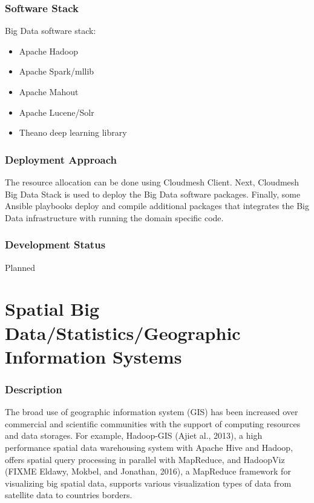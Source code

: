 \documentclass[9pt,twocolumn,twoside]{styles/osajnl}
\begin{document}
\subsubsection{Software Stack}

Big Data software stack:

\begin{itemize}
\item Apache Hadoop
\item Apache Spark/mllib
\item Apache Mahout
\item Apache Lucene/Solr
\item Theano deep learning library
\end{itemize}

\subsubsection{Deployment Approach}

The resource allocation can be done using Cloudmesh Client.  Next,
Cloudmesh Big Data Stack is used to deploy the Big Data software
packages.  Finally, some Ansible playbooks deploy and compile
additional packages that integrates the Big Data infrastructure with
running the domain specific code.

\subsubsection{Development Status}

Planned


\section{Spatial Big Data/Statistics/Geographic Information Systems}

\subsubsection{Description}

The broad use of geographic information system (GIS) has been
increased over commercial and scientific communities with the support
of computing resources and data storages. For example, Hadoop-GIS
(Ajiet al., 2013), a high performance spatial data warehousing system
with Apache Hive and Hadoop, offers spatial query processing in
parallel with MapReduce, and HadoopViz (FIXME Eldawy, Mokbel, and Jonathan,
2016), a MapReduce framework for visualizing big spatial data,
supports various visualization types of data from satellite data to
countries borders.
\end{document}
